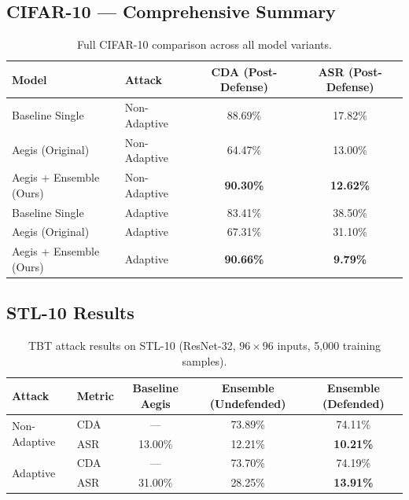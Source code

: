 \documentclass[12pt,a4paper]{article}
\newcommand{\asr}{\textsc{ASR}}
\newcommand{\cda}{\textsc{CDA}}
\begin{document}
\subsection{CIFAR-10 --- Comprehensive Summary}

\begin{table}[H]
    \centering
    \caption{Full CIFAR-10 comparison across all model variants.}
    \label{tab:cifar10_full}
    \begin{tabular}{llcc}
        \toprule
        \textbf{Model} & \textbf{Attack} & \textbf{\cda{} (Post-Defense)} & \textbf{\asr{} (Post-Defense)} \\
        \midrule
        Baseline Single         & Non-Adaptive & 88.69\% & 17.82\% \\
        Aegis (Original)        & Non-Adaptive & 64.47\% & 13.00\% \\
        \rowcolor{lightblue}
        Aegis + Ensemble (Ours) & Non-Adaptive & \textbf{90.30\%} & \textbf{12.62\%} \\
        \midrule
        Baseline Single         & Adaptive & 83.41\% & 38.50\% \\
        Aegis (Original)        & Adaptive & 67.31\% & 31.10\% \\
        \rowcolor{lightblue}
        Aegis + Ensemble (Ours) & Adaptive & \textbf{90.66\%} & \textbf{9.79\%} \\
        \bottomrule
    \end{tabular}
\end{table}

\subsection{STL-10 Results}

\begin{table}[H]
    \centering
    \caption{TBT attack results on STL-10 (ResNet-32, $96\times96$ inputs, 5{,}000 training samples).}
    \label{tab:stl10}
    \begin{tabular}{llccc}
        \toprule
        \textbf{Attack} & \textbf{Metric} & \textbf{Baseline Aegis} & \textbf{Ensemble (Undefended)} & \textbf{Ensemble (Defended)} \\
        \midrule
        \multirow{2}{*}{Non-Adaptive}
          & \cda{} & ---     & 73.89\% & 74.11\% \\
          & \asr{} & 13.00\% & 12.21\% & \textbf{10.21\%} \\
        \midrule
        \multirow{2}{*}{Adaptive}
          & \cda{} & ---     & 73.70\% & 74.19\% \\
          & \asr{} & 31.00\% & 28.25\% & \textbf{13.91\%} \\
        \bottomrule
    \end{tabular}
\end{table}
\end{document}
